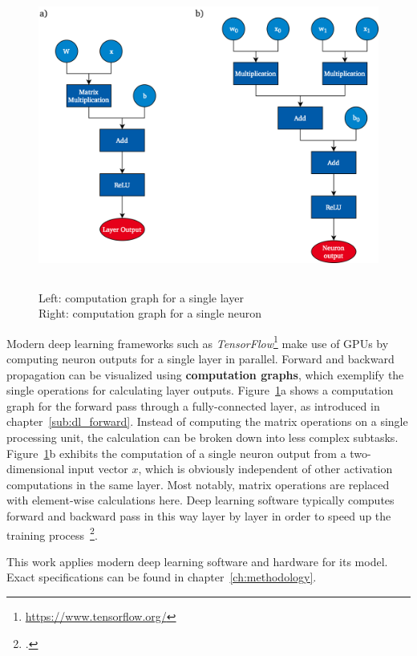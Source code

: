 \begin{figure}[h]
  \centering
  \includegraphics[height=10cm]{img/computation_graph_3}
  \caption[Computation graph for single layer and neuron]{Left: computation graph for a single layer \\ Right: computation graph for a single neuron}
\label{fig:comp_graph}
\end{figure}

Modern deep learning frameworks such as \textit{TensorFlow}\footnote{\url{https://www.tensorflow.org/}}
make use of GPUs by computing neuron outputs for a single layer in parallel.
Forward and backward propagation can be visualized using \textbf{computation
graphs}, which exemplify the single operations for calculating layer outputs.
Figure~\ref{fig:comp_graph}a shows a computation graph for the forward
pass through a fully-connected layer, as introduced in chapter~\ref{sub:dl_forward}.
Instead of computing the matrix operations on a single processing unit, the
calculation can be broken down into less complex subtasks.
Figure~\ref{fig:comp_graph}b exhibits the computation of a single neuron output
from a two-dimensional input vector $x$, which is obviously independent of
other activation computations in the same layer.
Most notably, matrix operations are replaced with element-wise calculations here.
Deep learning software typically computes forward and backward pass in this way
layer by layer in order to speed up the training process~\footcite{Abadi2016}.

This work applies modern deep learning software and hardware for its model.
Exact specifications can be found in chapter~\ref{ch:methodology}.

